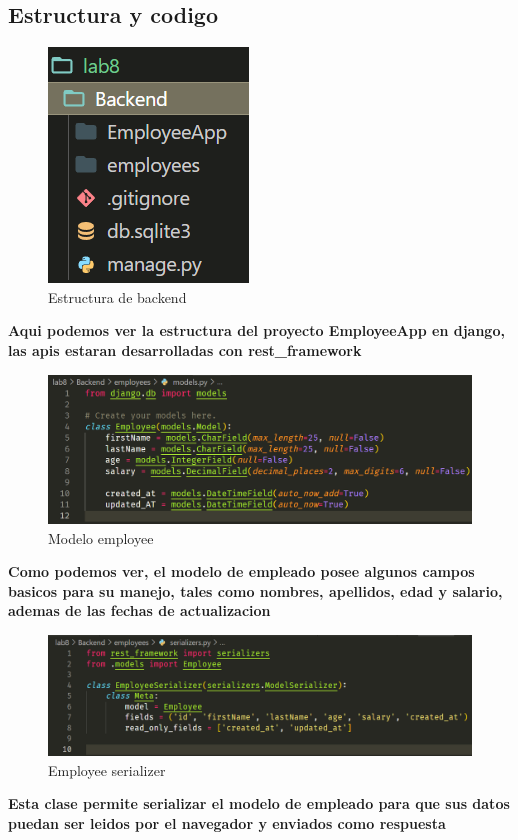 \documentclass{article}
\begin{document}
    \subsection{Estructura y codigo}
        \begin{figure}[ht]
            \centering
            \includegraphics{img/img0.png}
            \caption{Estructura de backend}
            \label{fig:enter-label}
        \end{figure}
        \textbf{Aqui podemos ver la estructura del proyecto EmployeeApp en django, las apis estaran desarrolladas con rest\_framework}
        
        \begin{figure}[ht]
            \centering
            \includegraphics[scale=0.5]{img/img1.png}
            \caption{Modelo employee}
            \label{fig:enter-label}
        \end{figure}
        \textbf{Como podemos ver, el modelo de empleado posee algunos campos basicos para su manejo, tales como nombres, apellidos, edad y salario, ademas de las fechas de actualizacion}

        
        \begin{figure}[ht]
            \centering
            \includegraphics[scale=0.5]{img/img2.png}
            \caption{Employee serializer}
            \label{fig:enter-label}
        \end{figure}
        \textbf{Esta clase permite serializar el modelo de empleado para que sus datos puedan ser leidos por el navegador y enviados como respuesta}
        \newpage
        
\end{document}
